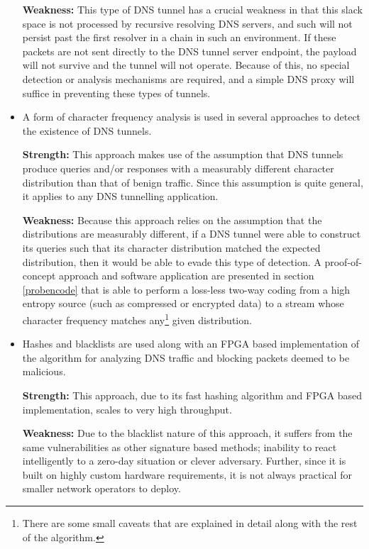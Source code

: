 \documentclass[12pt]{article}
\theoremstyle{remark}
\theoremstyle{definition}
\theoremstyle{definition}
\theoremstyle{definition}
\begin{document}
\begin{itemize}
\textbf{Weakness:} This type of DNS tunnel has a crucial weakness in that this
slack space is not processed by recursive resolving DNS servers, and such will
not persist past the first resolver in a chain in such an environment. If these
packets are not sent directly to the DNS tunnel server endpoint, the payload
will not survive and the tunnel will not operate. Because of this, no special
detection or analysis mechanisms are required, and a simple DNS proxy will
suffice in preventing these types of tunnels.

\item A form of character frequency analysis is used in several approaches to
detect the existence of DNS tunnels.

\textbf{Strength:} This approach makes use of the assumption that DNS tunnels
produce queries and/or responses with a measurably different character
distribution than that of benign traffic. Since this assumption is quite
general, it applies to any DNS tunnelling application.

\textbf{Weakness:} Because this approach relies on the assumption that the
distributions are measurably different, if a DNS tunnel were able to construct
its queries such that its character distribution matched the expected
distribution, then it would be able to evade this type of detection. A
proof-of-concept approach and software application are presented in section
\ref{probencode} that is able to perform a loss-less two-way coding from a high
entropy source (such as compressed or encrypted data) to a stream whose
character frequency matches any\footnote{There are some small caveats that are
explained in detail along with the rest of the algorithm.} given distribution.

\item Hashes and blacklists are used along with an FPGA based implementation of
the algorithm for analyzing DNS traffic and blocking packets deemed to be
malicious.

\textbf{Strength:} This approach, due to its fast hashing algorithm and FPGA
based implementation, scales to very high throughput.

\textbf{Weakness:} Due to the blacklist nature of this approach, it suffers from
the same vulnerabilities as other signature based methods; inability to react
intelligently to a zero-day situation or clever adversary. Further, since it is
built on highly custom hardware requirements, it is not always practical for
smaller network operators to deploy.


\end{itemize}
\end{document}
